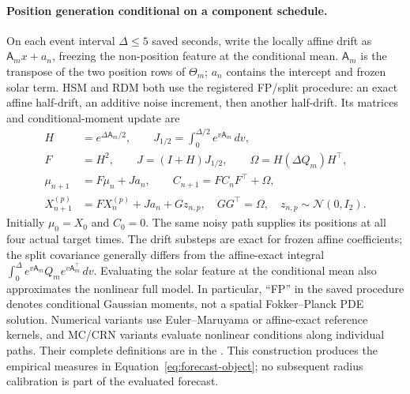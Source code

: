 \paragraph{Position generation conditional on a component schedule.}
On each event interval $\Delta\leq5$ saved
seconds, write the locally affine drift as $\mathsf A_m x+a_n$, freezing
the non-position feature at the conditional mean. $\mathsf A_m$ is the
transpose of the two position rows of $\Theta_m$; $a_n$ contains the
intercept and frozen solar term. HSM and RDM both use the registered FP/split procedure:
an exact affine half-drift, an additive noise increment, then another
half-drift. Its matrices and conditional-moment update are
\begin{align}
 H&=e^{\Delta\mathsf A_m/2},\qquad
 J_{1/2}=\int_0^{\Delta/2} e^{v\mathsf A_m}\,dv,\nonumber\\
 F&=H^2,\qquad J=(I+H)J_{1/2},\qquad
 \Omega=H(\Delta Q_m)H^\top,
 \label{eq:main-affine-kernel}\\
 \mu_{n+1}&=F\mu_n+Ja_n,\qquad
 C_{n+1}=FC_nF^\top+\Omega,\label{eq:main-moment-update}\\
 X_{n+1}^{(p)}&=FX_n^{(p)}+Ja_n+Gz_{n,p},\quad
 GG^\top=\Omega,\quad z_{n,p}\sim\mathcal N(0,I_2).
 \label{eq:main-particle-update}
\end{align}
Initially $\mu_0=X_0$ and $C_0=0$. The same noisy path supplies its
positions at all four actual target times. The drift substeps are exact
for frozen affine coefficients; the split covariance generally differs
from the affine-exact integral
$\int_0^\Delta e^{v\mathsf A_m}Q_m e^{v\mathsf A_m^\top}\,dv$.
Evaluating the solar feature at the conditional mean also approximates
the nonlinear full model. In particular,
``FP'' in the saved procedure denotes conditional Gaussian moments,
not a spatial Fokker--Planck PDE solution. Numerical variants use
Euler--Maruyama or affine-exact reference kernels, and MC/CRN variants evaluate nonlinear
conditions along individual paths. Their complete definitions are in the
. This construction produces the empirical measures
in Equation~\eqref{eq:forecast-object}; no subsequent radius calibration
is part of the evaluated forecast.
